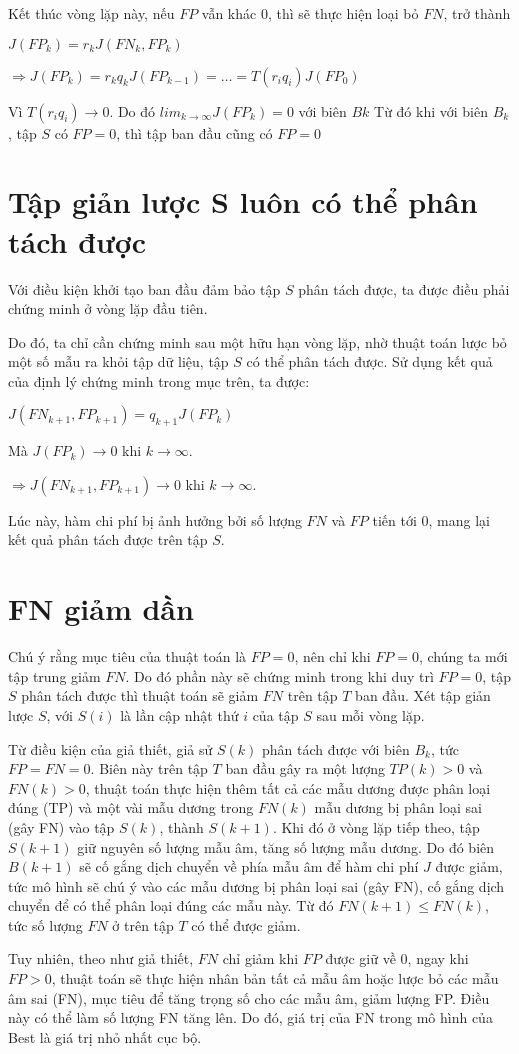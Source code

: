 \documentclass[./../main.tex]{subfiles}
\begin{document}
Kết thúc vòng lặp này, nếu $FP$ vẫn khác 0, thì sẽ thực hiện loại bỏ $FN$, trở thành


$J(FP_k) = r_k J(FN_k, FP_k)$


$\Rightarrow J(FP_k) = r_k q_k J(FP_{k-1}) = \ldots = T(r_i q_i)J(FP_0)$

Vì $T(r_i q_i) \rightarrow 0$. Do đó $lim_{k \to \infty} J(FP_k) = 0$ với biên $Bk$
Từ đó khi với biên $B_k$, tập $S$ có $FP = 0$, thì tập ban đầu cũng có $FP=0$

\section{Tập giản lược S luôn có thể phân tách được}

Với điều kiện khởi tạo ban đầu đảm bảo tập $S$ phân tách được, ta được điều phải chứng minh ở vòng lặp đầu tiên.

Do đó, ta chỉ cần chứng minh sau một hữu hạn vòng lặp, nhờ thuật toán lược bỏ một số mẫu ra khỏi tập dữ liệu, tập $S$ có thể phân tách được. Sử dụng kết quả của định lý chứng minh trong mục trên, ta được:

$J(FN_{k+1}, FP_{k+1}) = q_{k+1} J(FP_k)$


Mà $J(FP_k) \rightarrow 0$ khi $k \to \infty$.


$ \Rightarrow J(FN_{k+1}, FP_{k+1}) \rightarrow 0$ khi $k \to \infty$.

Lúc này, hàm chi phí bị ảnh hưởng bởi số lượng $FN$ và $FP$ tiến tới $0$, mang lại kết quả phân tách được trên tập $S$.


\section{FN giảm dần}

Chú ý rằng mục tiêu của thuật toán là $FP = 0$, nên chỉ khi $FP=0$, chúng ta mới tập trung giảm $FN$. Do đó phần này sẽ chứng minh trong khi duy trì $FP=0$, tập $S$ phân tách được thì thuật toán sẽ giảm $FN$ trên tập $T$ ban đầu.
Xét tập giản lược $S$, với $S(i)$ là lần cập nhật thứ $i$ của tập $S$ sau mỗi vòng lặp.

Từ điều kiện của giả thiết, giả sử $S(k)$ phân tách được với biên $B_k$, tức $FP=FN=0$. Biên này trên tập $T$ ban đầu gây ra một lượng $TP(k)>0$ và $FN(k) >0$, thuật toán thực hiện thêm tất cả các mẫu dương được phân loại đúng (TP) và một vài mẫu dương trong $FN(k)$ mẫu dương bị phân loại sai (gây FN) vào tập $S(k)$, thành $S(k+1)$. Khi đó ở vòng lặp tiếp theo, tập $S(k+1)$ giữ nguyên số lượng mẫu âm, tăng số lượng mẫu dương. Do đó biên $B(k+1)$ sẽ cố gắng dịch chuyển về phía mẫu âm để hàm chi phí $J$ được giảm, tức mô hình sẽ chú ý vào các mẫu dương bị phân loại sai (gây FN), cố gắng dịch chuyển để có thể phân loại đúng các mẫu này. Từ đó $FN(k+1) \leq FN(k)$, tức số lượng $FN$ ở trên tập $T$ có thể được giảm.

Tuy nhiên, theo như giả thiết, $FN$ chỉ giảm khi $FP$ được giữ về 0, ngay khi $FP >0$, thuật toán sẽ thực hiện nhân bản tất cả mẫu âm hoặc lược bỏ các mẫu âm sai (FN), mục tiêu để tăng trọng số cho các mẫu âm, giảm lượng FP. Điều này có thể làm số lượng FN tăng lên. Do đó, giá trị của FN trong mô hình của Best là giá trị nhỏ nhất cục bộ.
\end{document}
